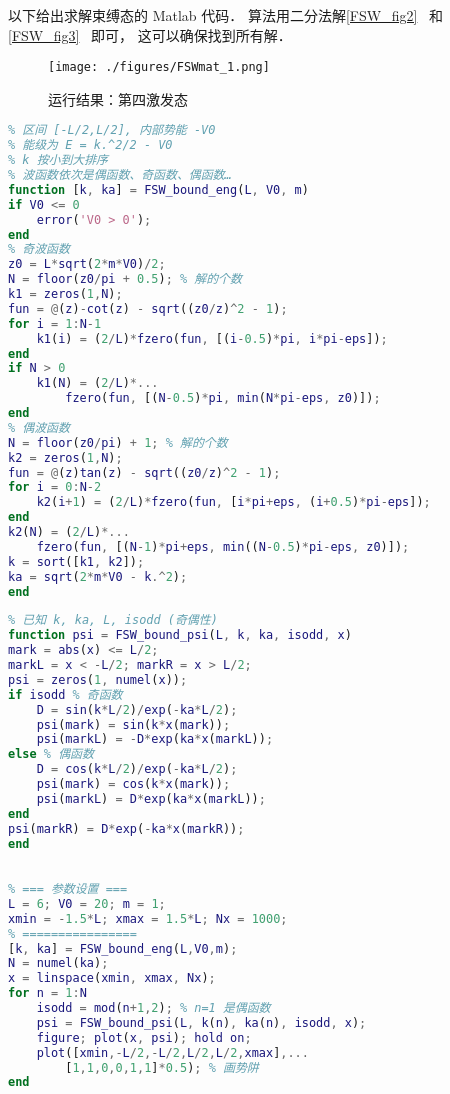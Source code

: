 

以下给出求解束缚态的 Matlab 代码． 算法用二分法解\autoref{FSW_fig2}~ 和\autoref{FSW_fig3}~ 即可， 这可以确保找到所有解．

\begin{figure}[ht]
\centering
\texttt{[image: ./figures/FSWmat\_1.png]}
\caption{运行结果：第四激发态} \label{FSWmat_fig1}
\end{figure}

\begin{lstlisting}[language=matlab, caption=FSW\_bound\_eng.m]
% 计算有限深势阱的束缚态参数 k, ka
% 区间 [-L/2,L/2], 内部势能 -V0
% 能级为 E = k.^2/2 - V0
% k 按小到大排序
% 波函数依次是偶函数、奇函数、偶函数…
function [k, ka] = FSW_bound_eng(L, V0, m)
if V0 <= 0
    error('V0 > 0');
end
% 奇波函数
z0 = L*sqrt(2*m*V0)/2;
N = floor(z0/pi + 0.5); % 解的个数
k1 = zeros(1,N);
fun = @(z)-cot(z) - sqrt((z0/z)^2 - 1);
for i = 1:N-1
    k1(i) = (2/L)*fzero(fun, [(i-0.5)*pi, i*pi-eps]);
end
if N > 0
    k1(N) = (2/L)*...
        fzero(fun, [(N-0.5)*pi, min(N*pi-eps, z0)]);
end
% 偶波函数
N = floor(z0/pi) + 1; % 解的个数
k2 = zeros(1,N);
fun = @(z)tan(z) - sqrt((z0/z)^2 - 1);
for i = 0:N-2
    k2(i+1) = (2/L)*fzero(fun, [i*pi+eps, (i+0.5)*pi-eps]);
end
k2(N) = (2/L)*...
    fzero(fun, [(N-1)*pi+eps, min((N-0.5)*pi-eps, z0)]);
k = sort([k1, k2]);
ka = sqrt(2*m*V0 - k.^2);
end
\end{lstlisting}

\begin{lstlisting}[language=matlab, caption=FSW\_bound\_psi.m]
% 已知方势阱束缚态波函数的参数， 求波函数 psi(x)
% 已知 k, ka, L, isodd (奇偶性)
function psi = FSW_bound_psi(L, k, ka, isodd, x)
mark = abs(x) <= L/2;
markL = x < -L/2; markR = x > L/2;
psi = zeros(1, numel(x));
if isodd % 奇函数
    D = sin(k*L/2)/exp(-ka*L/2);
    psi(mark) = sin(k*x(mark));
    psi(markL) = -D*exp(ka*x(markL));
else % 偶函数
    D = cos(k*L/2)/exp(-ka*L/2);
    psi(mark) = cos(k*x(mark));
    psi(markL) = D*exp(ka*x(markL));
end
psi(markR) = D*exp(-ka*x(markR));
end
\end{lstlisting}

\begin{lstlisting}[language=matlab, caption=FSW\_bound\_plt.m]
% 有限深方势阱的波函数画图演示

% === 参数设置 ===
L = 6; V0 = 20; m = 1;
xmin = -1.5*L; xmax = 1.5*L; Nx = 1000;
% ================
[k, ka] = FSW_bound_eng(L,V0,m);
N = numel(ka);
x = linspace(xmin, xmax, Nx);
for n = 1:N
    isodd = mod(n+1,2); % n=1 是偶函数
    psi = FSW_bound_psi(L, k(n), ka(n), isodd, x);
    figure; plot(x, psi); hold on;
    plot([xmin,-L/2,-L/2,L/2,L/2,xmax],...
        [1,1,0,0,1,1]*0.5); % 画势阱
end
\end{lstlisting}
